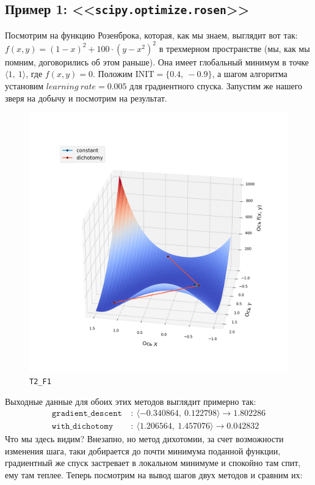 \documentclass[12pt, a4paper, oneside, final]{article}
\begin{document}
	\subsection*{Пример 1: <<\texttt{scipy.optimize.rosen}>>}
	Посмотрим на функцию Розенброка, которая, как мы знаем, выглядит вот так: $f(x, y) = (1 - x)^{2} + 100 \cdot (y - x^2)^2$ в трехмерном пространстве (мы, как мы помним, договорились об этом раньше). Она имеет глобальный минимум в точке $\langle 1, ~ 1 \rangle$, где $f(x, y) = 0$. Положим $\text{INIT} = \{0.4, ~ -0.9\}$, а шагом алгоритма установим $learning~rate = 0.005$ для градиентного спуска. Запустим же нашего зверя на добычу и посмотрим на результат.
	\begin{figure}[H]
		\centering
		\includegraphics[scale=0.68]{Image/T2_F1.png}
		\caption*{\texttt{T2\_F1}}
	\end{figure}
	Выходные данные для обоих этих методов выглядит примерно так:
	\begin{align*}
		\texttt{gradient\_descent}~&:~\langle -0.340864, ~ 0.122798\rangle \to 1.802286 \\
		\texttt{with\_dichotomy}~&:~\langle 1.206564, ~ 1.457076\rangle \to 0.042832
	\end{align*}
	Что мы здесь видим? Внезапно, но метод дихотомии, за счет возможности изменения шага, таки добирается до почти минимума поданной функции, градиентный же спуск застревает в локальном минимуме и спокойно там спит, ему там теплее. Теперь посмотрим на вывод шагов двух методов и сравним их:
\end{document}

